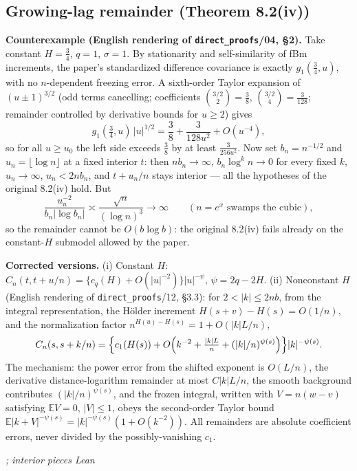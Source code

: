 \documentclass[11pt]{article}
\theoremstyle{definition}
\theoremstyle{remark}
\newcommand{\statustag}[1]{%
  \par\nobreak\begingroup\footnotesize\itshape\raggedleft #1\par\endgroup}
\newcommand{\Wwritten}{[written]}
\begin{document}
\subsection{Growing-lag remainder (Theorem 8.2(iv))}
\textbf{Counterexample (English rendering of \texttt{direct\_proofs}/04,
\S2).} Take constant $H=\tfrac34$, $q=1$, $\sigma=1$. By stationarity and
self-similarity of fBm increments, the paper's standardized difference
covariance is exactly $g_1(\tfrac34,u)$, with no $n$-dependent freezing
error. A sixth-order Taylor expansion of $(u\pm1)^{3/2}$ (odd terms
cancelling; coefficients $\binom{3/2}{2}=\tfrac38$,
$\binom{3/2}{4}=\tfrac3{128}$; remainder controlled by derivative bounds for
$u\ge2$) gives
\[
g_1(\tfrac34,u)\,|u|^{1/2}=\frac38+\frac3{128u^{2}}+O(u^{-4}),
\]
so for all $u\ge u_0$ the left side exceeds $\tfrac38$ by at least
$\tfrac3{256u^2}$. Now set $b_n=n^{-1/2}$ and $u_n=\lfloor\log n\rfloor$ at a
fixed interior $t$: then $nb_n\to\infty$, $b_n\log^{k}n\to0$ for every fixed
$k$, $u_n\to\infty$, $u_n<2nb_n$, and $t+u_n/n$ stays interior --- all the
hypotheses of the original 8.2(iv) hold. But
\[
\frac{u_n^{-2}}{b_n|\log b_n|}\asymp\frac{\sqrt n}{(\log n)^{3}}\to\infty
\qquad(n=e^{x}\text{ swamps the cubic}),
\]
so the remainder cannot be $O(b\log b)$: the original 8.2(iv) fails already
on the constant-$H$ submodel allowed by the paper.

\textbf{Corrected versions.} (i) Constant $H$:
$C_n(t,t+u/n)=\{c_q(H)+O(|u|^{-2})\}|u|^{-\psi}$, $\psi=2q-2H$.
(ii) Nonconstant $H$ (English rendering of \texttt{direct\_proofs}/12,
\S3.3): for $2<|k|\le2nb$, from the integral representation, the H\"older
increment $H(s+v)-H(s)=O(1/n)$, and the normalization factor
$n^{H(u)-H(s)}=1+O(|k|L/n)$,
\[
C_n(s,s+k/n)=\Bigl\{c_1(H(s))+O\Bigl(k^{-2}+\tfrac{|k|L}{n}
+(|k|/n)^{\psi(s)}\Bigr)\Bigr\}|k|^{-\psi(s)} .
\]
The mechanism: the power error from the shifted exponent is $O(L/n)$, the
derivative distance-logarithm remainder at most $C|k|L/n$, the smooth
background contributes $(|k|/n)^{\psi(s)}$, and the frozen integral, written
with $V=n(w-v)$ satisfying $\mathbb EV=0$, $|V|\le1$, obeys the second-order
Taylor bound
$\mathbb E|k+V|^{-\psi(s)}=|k|^{-\psi(s)}(1+O(k^{-2}))$. All remainders are
absolute coefficient errors, never divided by the possibly-vanishing $c_1$.
\statustag{\Wwritten; interior pieces Lean}

\smallskip{}
\end{document}
